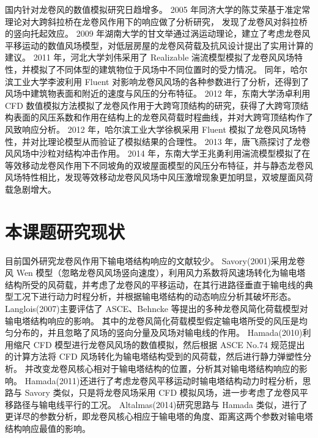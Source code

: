 国内针对龙卷风的数值模拟研究日趋增多。
2005 年同济大学的陈艾荣\cite{chen2004large}基于准定常理论对大跨斜拉桥在龙卷风作用下的响应做了分析研究，
发现了龙卷风对斜拉桥的竖向托起效应。
2009 年湖南大学的甘文举\cite{gan2009low}通过涡运动理论，建立了考虑龙卷风平移运动的数值风场模型，对低层房屋的龙卷风荷载及抗风设计提出了实用计算的建议。
2011 年，河北大学刘伟\cite{liu2011lou}采用了 Realizable 湍流模型模拟了龙卷风风场特性，并模拟了不同体型的建筑物位于风场中不同位置时的受力情况。
同年，哈尔滨工业大学李波利用 Fluent 对影响龙卷风风场的各种参数进行了分析，还得到了风场中建筑物表面和附近的速度与风压的分布特征。
2012 年，东南大学汤卓\cite{tang2012tornado}利用 CFD 数值模拟方法模拟了龙卷风作用于大跨穹顶结构的研究，获得了大跨穹顶结构表面的风压系数和作用在结构上的龙卷风荷载时程曲线，并对大跨穹顶结构作了风致响应分析。
2012 年，哈尔滨工业大学徐枫\cite{xu2013tornado}采用 Fluent 模拟了龙卷风风场特性，并对比理论模型从而验证了模拟结果的合理性。
2013 年，唐飞燕\cite{tang2013tornado}探讨了龙卷风风场中沙粒对结构冲击作用。
2014 年，东南大学王兆勇\cite{wang2015different}利用湍流模型模拟了在等效移动龙卷风作用下不同坡角的双坡屋面模型的风压分布特征，并与静态龙卷风风场特性相比，发现等效移动龙卷风风场中风压激增现象更加明显，双坡屋面风荷载急剧增大。

\section{本课题研究现状}
目前国外研究龙卷风作用下输电塔结构响应的文献较少。
Savory(2001)\cite{savory2001modelling}采用龙卷风 Wen 模型（忽略龙卷风风场竖向速度），利用风力系数将风速场转化为输电塔结构所受的风荷载，并考虑了龙卷风的平移运动，在其行进路径垂直于输电线的典型工况下进行动力时程分析，并根据输电塔结构的动态响应分析其破坏形态。
Langlois(2007)\cite{langlois2007design}主要评估了 ASCE、Behncke 等提出的多种龙卷风简化荷载模型对输电塔结构响应的影响。
其中的龙卷风简化荷载模型假定输电塔所受的风压是均匀分布的，并且忽略了风场的竖向分量及风场对输电线的作用。
Hamada(2010)\cite{hamada2010finite}利用缩尺 CFD 模型进行龙卷风风场的数值模拟，然后根据 ASCE No.74 规范提出的计算方法将 CFD 风场转化为输电塔结构受到的风荷载，然后进行静力弹塑性分析。
并改变龙卷风核心相对于输电塔结构的位置，分析其对输电塔结构响应的影响。
Hamada(2011)还进行了考虑龙卷风平移运动时输电塔结构动力时程分析，思路与 Savory 类似，只是将龙卷风场采用 CFD 模拟风场，进一步考虑了龙卷风平移路径与输电线平行的工况。
Altalmas(2014)\cite{altalmas2014finite}研究思路与 Hamada 类似，进行了更详尽的参数分析，即龙卷风核心相应于输电塔的角度、距离这两个参数对输电塔结构响应最值的影响。

